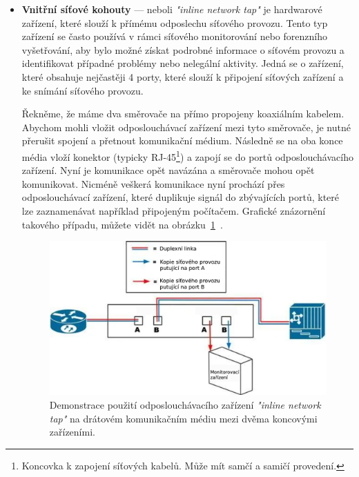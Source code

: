             \begin{itemize}
                \item \textbf{Vnitřní síťové kohouty} --- neboli \textit{"inline network tap"} je hardwarové zařízení, které slouží k přímému odposlechu síťového provozu. Tento typ zařízení se často používá \newline v rámci síťového monitorování nebo forenzního vyšetřování, aby bylo možné získat podrobné informace o síťovém provozu a identifikovat případné problémy nebo nelegální aktivity. Jedná se o zařízení, které obsahuje nejčastěji 4 porty, které slouží k připojení síťových zařízení a ke snímání síťového provozu. 

                Řekněme, že máme dva směrovače na přímo propojeny koaxiálním kabelem. Abychom mohli vložit odposlouchávací zařízení mezi tyto směrovače, je nutné přerušit spojení \newline a přetnout komunikační médium. Následně se na oba konce média vloží konektor (typicky RJ-45\footnote{Koncovka k zapojení síťových kabelů. Může mít samčí a samičí provedení.}) a zapojí se do portů odposlouchávacího zařízení. Nyní je komunikace opět navázána a směrovače mohou opět komunikovat. Nicméně veškerá komunikace nyní prochází přes odposlouchávací zařízení, které duplikuje signál do zbývajících portů, které lze zaznamenávat například připojeným počítačem. Grafické znázornění takového případu, můžete vidět na obrázku~\ref{fig:InlineNetworkTap}~\cite{BookTrackingHackersReference}.
                \begin{figure}[H]
                    \centering
                    \includegraphics[scale=0.4]{obrazky-figures/ForenzniAnalyza/DukazniMaterial/inlineNetworkTap.png}
                    \caption{Demonstrace použití odposlouchávacího zařízení \textit{"inline network tap"} na drátovém komunikačním médiu mezi dvěma koncovými zařízeními.}
                    \label{fig:InlineNetworkTap}
                \end{figure}


\end{itemize}
